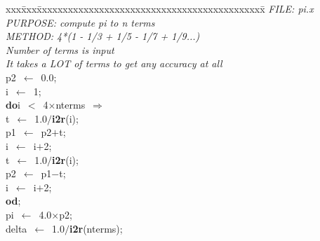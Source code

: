 \documentclass{report}
\begin{document}
\pagestyle{empty}
\begin{tabbing}
xxx\=xxx\=xxxxxxxxxxxxxxxxxxxxxxxxxxxxxxxxxxxxxxxxxxxx\=\kill
{\tt{}}{\em{} FILE:    pi.x}\\
{\tt{}}{\em{} PURPOSE: compute pi to n terms}\\
{\tt{}}{\em{} METHOD:  4*(1 - 1/3 + 1/5 - 1/7 + 1/9...)}\\
{\tt{}}{\em{}          Number of terms is input}\\
{\tt{}}{\em{}          It takes a LOT of terms to get any accuracy at all}\\
p2\ $\leftarrow$\ 0.0;\\
i\ $\leftarrow$\ 1;\\
{\bf do}\>i\ $<$\ 4$\times$nterms\ $\Rightarrow$
\>\\
\>t\ $\leftarrow$\ 1.0$/${\bf i2r}(i);\\
\>p1\ $\leftarrow$\ p2$+$t;\\
\>i\ $\leftarrow$\ i$+$2;\\
\>t\ $\leftarrow$\ 1.0$/${\bf i2r}(i);\\
\>p2\ $\leftarrow$\ p1$-$t;\>\\
\>i\ $\leftarrow$\ i$+$2;\\
{\bf od};
\\
pi\ $\leftarrow$\ 4.0$\times$p2;\>\>\\
delta\ $\leftarrow$\ 1.0$/${\bf i2r}(nterms);\>\>\\
\end{tabbing}
\end{document}
